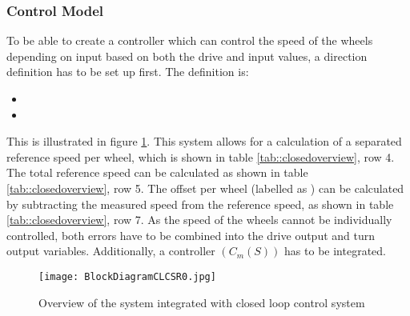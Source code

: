 \subsubsection{Control Model}
To be able to create a controller which can control the speed of the wheels depending on input based on both the drive and input values, a direction definition has to be set up first.
The definition is:
\begin{itemize}
\item {}
\item {}
\end{itemize}
This is illustrated in figure \ref{fig::controldiagram}.
This system allows for a calculation of a separated reference speed per wheel, which is shown in table \ref{tab::closedoverview}, row 4.
The total reference speed can be calculated as shown in table \ref{tab::closedoverview}, row 5.
The offset per wheel (labelled as ) can be calculated by subtracting the measured speed from the reference speed, as shown in table \ref{tab::closedoverview}, row 7.
As the speed of the wheels cannot be individually controlled, both errors have to be combined into the drive output and turn output variables.
Additionally, a controller $(C_m(S))$ has to be integrated.

\begin{figure}[H]
\centering
\texttt{[image: BlockDiagramCLCSR0.jpg]}
\caption{Overview of the system integrated with closed loop control system}
\label{fig::controldiagram}
\end{figure}


